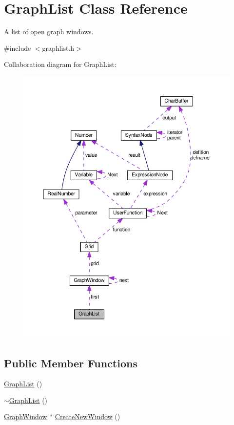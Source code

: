 \hypertarget{classGraphList}{}\section{Graph\+List Class Reference}
\label{classGraphList}


A list of open graph windows.  




{\ttfamily \#include $<$graphlist.\+h$>$}



Collaboration diagram for Graph\+List\+:
\nopagebreak
\begin{figure}[H]
\begin{center}
\leavevmode
\includegraphics[width=350pt]{de/de2/classGraphList__coll__graph}
\end{center}
\end{figure}
\subsection*{Public Member Functions}
\begin{DoxyCompactItemize}
\item 
\hyperlink{classGraphList_a7a5c8bcb31e753f7b32cbd7da34db063}{Graph\+List} ()
\item 
\hyperlink{classGraphList_a0cf2f539fc2594ae27f35d94deebc232}{$\sim$\+Graph\+List} ()
\item 
\hyperlink{classGraphWindow}{Graph\+Window} $\ast$ \hyperlink{classGraphList_a184e5ad986cd07281a96dc107ebfcd5d}{Create\+New\+Window} ()
\end{DoxyCompactItemize}
